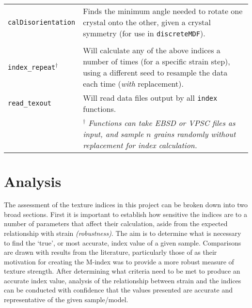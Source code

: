 \documentclass[a4paper,12pt]{report}
\numberwithin{equation}{chapter}
\begin{document}
\begin{table}[p!]
\begin{tabularx}{\textwidth}{lX}
\texttt{calDisorientation} & Finds the minimum angle needed to rotate one crystal onto the other, given a crystal symmetry (for use in \texttt{discreteMDF}). \\
\\
\hline
\hline

\texttt{index\_{}repeat}$^{\dagger}$ & Will calculate any of the above indices a number of times (for a specific strain step), using a different seed to resample the data each time (\emph{with} replacement). \\

\texttt{read\_{}texout} & Will read data files output by all \texttt{index} functions. \\
\hline
& \footnotesize{$^\dagger$ \textit{Functions can take EBSD or VPSC files as input, and sample $n$ grains randomly without replacement for index calculation.}} \\

\end{tabularx}
\label{tab:functions}
\end{table}

%

\chapter{Analysis}
\vspace{-1cm}
The assessment of the texture indices in this project can be broken down into two broad sections. First it is important to establish how sensitive the indices are to a number of parameters that affect their calculation, aside from the expected relationship with strain \emph{(robustness)}. The aim is to determine what is necessary to find the \lq{}true\rq{}, or most accurate, index value of a given sample. Comparisons are drawn with results from the literature, particularly those of \cite{Skemer} as their motivation for creating the M-index was to provide a more robust measure of texture strength. After determining what criteria need to be met to produce an accurate index value, analysis of the relationship between strain and the indices can be conducted with confidence that the values presented are accurate and representative of the given sample/model.      
\end{document}
